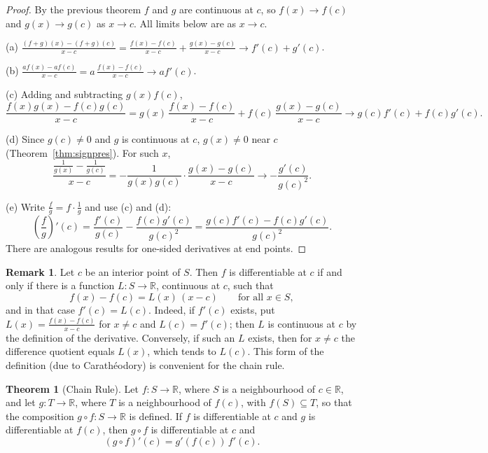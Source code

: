 \documentclass[11pt,a4paper]{article}
\numberwithin{equation}{section}
\theoremstyle{definition}
\newtheorem{thm}{Theorem}[subsection]
\newtheorem*{remark}{Remark}
\begin{document}
\begin{proof}
By the previous theorem $f$ and $g$ are continuous at $c$, so $f(x)\longrightarrow f(c)$ and $g(x)\longrightarrow g(c)$ as $x\longrightarrow c$. All limits below are as $x\longrightarrow c$.

(a) $\displaystyle\frac{(f+g)(x) - (f+g)(c)}{x  - c} = \frac{f(x) - f(c)}{x - c} + \frac{g(x) - g(c)}{x - c}\longrightarrow f'(c) + g'(c)$.

(b) $\displaystyle\frac{af(x) - af(c)}{x - c} = a\,\frac{f(x) - f(c)}{x - c}\longrightarrow af'(c)$.

(c) Adding and subtracting $g(x)f(c)$,
$$\frac{f(x) g(x) - f(c) g(c)}{x - c} = g(x)\,\frac{f(x) - f(c)}{x - c} + f(c)\,\frac{g(x) - g(c)}{x - c}\longrightarrow g(c) f'(c) + f(c) g'(c) .$$

(d) Since $g(c)\neq0$ and $g$ is continuous at $c$, $g(x)\neq0$ near $c$ (Theorem~\ref{thm:signpres}). For such $x$,
$$\frac{\frac{1}{g(x)} - \frac{1}{g(c)}}{x - c} = -\frac{1}{g(x) g(c)}\cdot\frac{g(x) - g(c)}{x - c}\longrightarrow -\frac{g'(c)}{g(c)^2} .$$

(e) Write $\frac{f}{g} = f\cdot\frac{1}{g}$ and use (c) and (d):
$$\left(\frac{f}{g}\right)'(c) = \frac{f'(c)}{g(c)} - \frac{f(c) g'(c)}{g(c)^2} = \frac{g(c) f'(c) - f(c) g'(c)}{g(c)^2} .$$
There are analogous results for one-sided derivatives at end points.
\end{proof}

\begin{remark}
Let $c$ be an interior point of $S$. Then $f$ is differentiable at $c$ if and only if there is a function $L: S\longrightarrow \mathbb{R}$, continuous at $c$, such that
$$f(x) - f(c) = L(x)\,(x - c)\qquad\text{for all } x\in S,$$
and in that case $f'(c) = L(c)$. Indeed, if $f'(c)$ exists, put $L(x) = \frac{f(x) - f(c)}{x - c}$ for $x\neq c$ and $L(c) = f'(c)$; then $L$ is continuous at $c$ by the definition of the derivative. Conversely, if such an $L$ exists, then for $x\neq c$ the difference quotient equals $L(x)$, which tends to $L(c)$. This form of the definition (due to Carath\'eodory) is convenient for the chain rule.
\end{remark}


\begin{thm}[Chain Rule]
Let $f: S\longrightarrow \mathbb{R}$, where $S$ is a neighbourhood of $c\in \mathbb{R}$, and let $g: T\longrightarrow \mathbb{R}$, where $T$ is a neighbourhood of $f(c)$, with $f(S)\subseteq T$, so that the composition $g\circ f: S\longrightarrow \mathbb{R}$ is defined. If $f$ is differentiable at $c$ and $g$ is differentiable at $f(c)$, then $g\circ f$ is differentiable at $c$ and
$$(g\circ f)'(c) = g'(f(c))\, f'(c) .$$
\end{thm}
\end{document}

